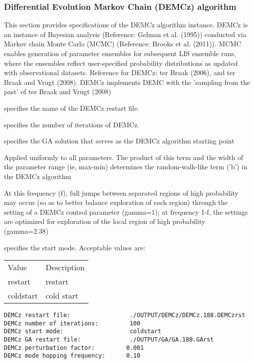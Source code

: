  
 \subsubsection{Differential Evolution Markov Chain (DEMCz) algorithm} \label{ssec:demcz}
 This section provides specifications of the DEMCz algorithm instance.
 DEMCz is an instance of Bayesian analysis (Reference: Gelman et al. (1995)) conducted via 
 Markov chain Monte Carlo (MCMC) (Reference: Brooks et al. (2011)).
 MCMC enables generation of parameter ensembles for subsequent LIS ensemble runs,
 where the ensembles reflect user-specified probability distributions as updated with
 observational datasets.
 Reference for DEMCz: ter Braak (2006), and ter Braak and Vrugt (2008).
 DEMCz implements DEMC with the 'sampling from the past' of ter Braak and Vrugt (2008)
 

 
  specifies the name of the 
 DEMCz restart file.

  specifies the 
 number of iterations of DEMCz.

  specifies the GA solution
  that serves as the DEMCz algorithm starting point

  Applied uniformly to 
  all parameters.  The product of this term and the 
 width of the parameter range (ie, max-min) determines the random-walk-like term ('b') in the DEMCz algorithm 

  At this frequency (f), full jumps between separated regions of high probability 
 may occur (so as to better balance exploration of each region) through the setting of a DEMCz
 control parameter (gamma=1); at frequency 1-f, the settings are optimized for exploration of the local region of high probability (gamma=2.38) 

  specifies the start mode.
 Acceptable values are:

 \begin{tabular}{ll}
 Value     & Description \\
 restart   & restart     \\
 coldstart & cold start  \\
 \end{tabular}
 

 \begin{Verbatim}[frame=single]
DEMCz restart file:                 ./OUTPUT/DEMCz/DEMCz.188.DEMCzrst
DEMCz number of iterations:         100
DEMCz start mode:                   coldstart 
DEMCz GA restart file:              ./OUTPUT/GA/GA.188.GArst
DEMCz perturbation factor:         0.001
DEMCz mode hopping frequency:      0.10
 \end{Verbatim}


